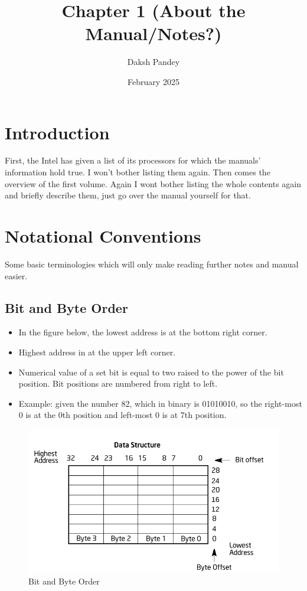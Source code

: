 \documentclass{article}
\title{Chapter 1 (About the Manual/Notes?)}
\author{Daksh Pandey}
\date{February 2025}
\begin{document}
\maketitle

\section{Introduction}
First, the Intel has given a list of its processors for which the manuals' information hold true. I won't bother listing them again. Then comes the overview of the first volume. Again I wont bother listing the whole contents again and briefly describe them, just go over the manual yourself for that. 


\section{Notational Conventions}
Some basic terminologies which will only make reading further notes and manual easier. 
\subsection{Bit and Byte Order}
\begin{itemize}
    \item In the figure below, the lowest address is at the bottom right corner. 
    \item Highest address in at the upper left corner. 
    \item Numerical value of a set bit is equal to two raised to the power of the bit position. Bit positions are numbered from right to left. 
    \item Example: given the number 82, which in binary is 01010010, so the right-most 0 is at the 0th position and left-most 0 is at 7th position.
\end{itemize}
\begin{figure}
    \centering
    \includegraphics[width=1\linewidth]{Screenshot from 2025-02-07 16-36-12.png}
    \caption{Bit and Byte Order}
    \label{fig:bit_byte}
\end{figure}
\end{document}
